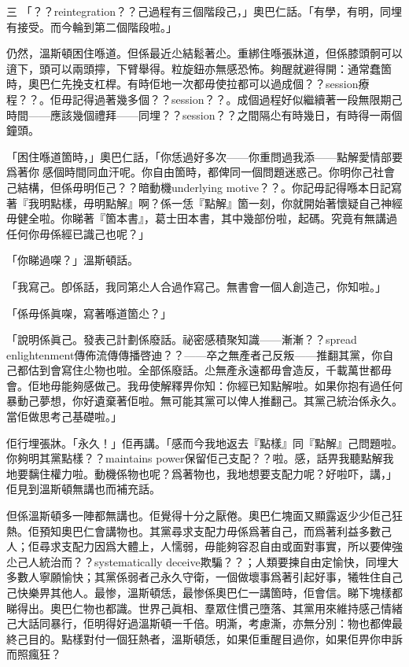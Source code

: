 三
「？？reintegration？？己過程有三個階段己，」奧巴仁話。「有學，有明，同埋有接受。而今輪到第二個階段啦。」

仍然，溫斯頓困住喺道。但係最近尐結鬆著尐。重綁住喺張牀道，但係膝頭䯊可以逳下，頭可以兩頭擰，下臂舉得。粒旋鈕亦無感恐怖。夠醒就避得開：通常蠢箇時，奧巴仁先挽支杠桿。有時佢地一次都毋使拉都可以過成個？？session療程？？。佢毋記得過著幾多個？？session？？。成個過程好似繼續著一段無限期己時間——應該幾個禮拜——同埋？？session？？之間隔尐有時幾日，有時得一兩個鐘頭。

「困住喺道箇時，」奧巴仁話，「你恁過好多次——你重問過我添——點解愛情部要爲著你𥕶感個時間同血汗呢。你自由箇時，都俾同一個問題迷惑己。你明你己社會己結構，但係毋明佢己？？暗動機underlying motive？？。你記毋記得喺本日記寫著『我明點樣，毋明點解』啊？係一恁『點解』箇一刻，你就開始著懷疑自己神經毋健全啦。你睇著『箇本書』，葛士田本書，其中幾部份啦，起碼。究竟有無講過任何你毋係經已識己也呢？」

「你睇過㗎？」溫斯頓話。

「我寫己。卽係話，我同第尐人合過作寫己。無書會一個人創造己，你知啦。」

「係毋係眞㗎，寫著喺道箇尐？」

「說明係眞己。發表己計劃係廢話。祕密感積聚知識——漸漸？？spread enlightenment傳佈流傳傳播啓迪？？——卒之無產者己反叛——推翻其黨，你自己都估到會寫住尐物也啦。全部係廢話。尐無產永遠都毋會造反，千載萬世都毋會。佢地毋能夠感做己。我毋使解釋畀你知：你經已知點解啦。如果你抱有過任何暴動己夢想，你好遺棄著佢啦。無可能其黨可以俾人推翻己。其黨己統治係永久。當佢做思考己基礎啦。」

佢行埋張牀。「永久！」佢再講。「感而今我地返去『點樣』同『點解』己問題啦。你夠明其黨點樣？？maintains power保留佢己支配？？啦。感，話畀我聽點解我地要黐住權力啦。動機係物也呢？爲著物也，我地想要支配力呢？好啦吓，講，」佢見到溫斯頓無講也而補充話。

但係溫斯頓多一陣都無講也。佢覺得十分之厭倦。奧巴仁塊面又顯露返少少佢己狂熱。佢預知奧巴仁會講物也。其黨尋求支配力毋係爲著自己，而爲著利益多數己人；佢尋求支配力因爲大體上，人懦弱，毋能夠容忍自由或面對事實，所以要俾強尐己人統治而？？systematically deceive欺騙？？；人類要揀自由定愉快，同埋大多數人寧願愉快；其黨係弱者己永久守衛，一個做壞事爲著引起好事，犧牲住自己己快樂畀其他人。最惨，溫斯頓恁，最惨係奧巴仁一講箇時，佢會信。睇下塊樣都睇得出。奧巴仁物也都識。世界己眞相、羣眾住慣己墮落、其黨用來維持感己情緒己大話同暴行，佢明得好過溫斯頓一千倍。明澌，考慮澌，亦無分別：物也都俾最終己目的。點樣對付一個狂熱者，溫斯頓恁，如果佢重醒目過你，如果佢畀你申訴而照瘋狂？

